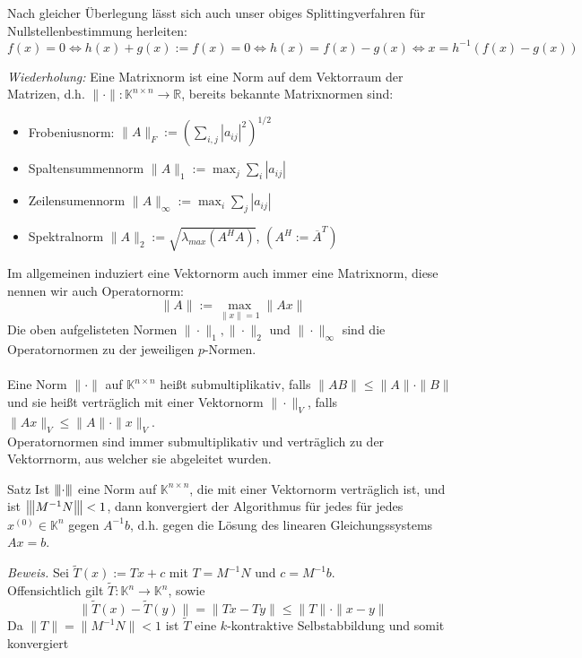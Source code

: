 \documentclass{article}
\begin{document}
\begin{rembox}
    Nach gleicher Überlegung lässt sich auch unser obiges Splittingverfahren für Nullstellenbestimmung herleiten:
    \[f(x)=0\Leftrightarrow h(x)+g(x):=f(x) = 0 \Leftrightarrow h(x)=f(x)-g(x) \Leftrightarrow x=h^{-1}(f(x)-g(x))\]
\end{rembox}
\textit{Wiederholung:} Eine Matrixnorm ist eine Norm auf dem Vektorraum der Matrizen, 
d.h. $\|\cdot\|:\mathbb{K}^{n\times n}\rightarrow \mathbb{R}$, bereits bekannte Matrixnormen sind:
\begin{itemize}
    \item Frobeniusnorm: $\|A\|_F := \left(\displaystyle \sum_{i,j}|a_{ij}|^2\right)^{1/2}$
    \item Spaltensummennorm $\|A\|_1:=\max_j \sum_i |a_{ij}|$
    \item Zeilensumennorm $\|A\|_\infty:=\max_i \sum_j |a_{ij}|$
    \item Spektralnorm $\|A\|_2:=\sqrt{\lambda_{max}(A^HA)}$, \qquad $(A^H := \overline{A}^T)$
\end{itemize}
Im allgemeinen induziert eine Vektornorm auch immer eine Matrixnorm, diese nennen wir auch Operatornorm:
\[\|A\|:=\max_{\|x\|=1}\|Ax\|\]
Die oben aufgelisteten Normen $\|\cdot\|_1,\|\cdot\|_2$ und $\|\cdot\|_\infty$ sind die Operatornormen zu 
der jeweiligen $p$-Normen. \\ \\
Eine Norm $\|\cdot\|$ auf $\mathbb{K}^{n\times n}$ heißt submultiplikativ, falls $\|AB\|\leq\|A\|\cdot\|B\|$ 
und sie heißt verträglich mit einer Vektornorm $\|\cdot\|_V$, falls $\|Ax\|_V\leq \|A\|\cdot\|x\|_V$. \\
Operatornormen sind immer submultiplikativ und verträglich zu der Vektorrnorm, aus welcher sie abgeleitet wurden.
\begin{thmbox}{Satz}
    Ist ${\left\vert\kern-0.25ex\left\vert\kern-0.25ex\left\vert \cdot \right\vert\kern-0.25ex\right\vert\kern-0.25ex\right\vert}$ eine Norm auf $\mathbb{K}^{n\times n}$, die mit einer Vektornorm verträglich ist, 
    und ist ${\left\vert\kern-0.25ex\left\vert\kern-0.25ex\left\vert M^{-1}N \right\vert\kern-0.25ex\right\vert\kern-0.25ex\right\vert}<1$, dann konvergiert der Algorithmus für jedes für jedes $x^{(0)}\in\mathbb{K}^n$ 
    gegen $A^{-1}b$, d.h. gegen die Lösung des linearen Gleichungssystems $Ax=b$.
\end{thmbox}
\textit{Beweis.} Sei $\tilde{T}(x) := Tx + c$ mit $T=M^{-1}N$ und $c=M^{-1}b$.\\
Offensichtlich gilt $\tilde{T}:\mathbb{K}^n\rightarrow\mathbb{K}^n$, sowie 
\[\|\tilde{T}(x)-\tilde{T}(y)\| = \|Tx-Ty\|\leq \|T\|\cdot\|x-y\|\]
Da $\|T\|=\|M^{-1}N\|<1$ ist $\tilde{T}$ eine $k$-kontraktive Selbstabbildung und somit konvergiert 
\end{document}
